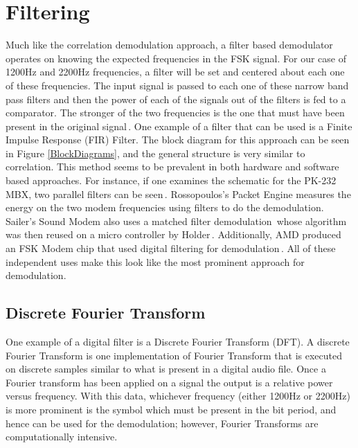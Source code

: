 \section{Filtering}
Much like the correlation demodulation approach, a filter based demodulator operates on knowing the expected frequencies in the FSK signal. For our case of 1200Hz and 2200Hz frequencies, a filter will be set and centered about each one of these frequencies. The input signal is passed to each one of these narrow band pass filters and then the power of each of the signals out of the filters is fed to a comparator. The stronger of the two frequencies is the one that must have been present in the original signal\,\cite{Watson1980}. One example of a filter that can be used is a Finite Impulse Response (FIR) Filter. The block diagram for this approach can be seen in Figure \ref{BlockDiagrams}, and the general structure is very similar to correlation. This method seems to be prevalent in both hardware and software based approaches. For instance, if one examines the schematic for the PK-232 MBX, two parallel filters can be seen\,\cite{Inc.2001}. Rossopoulos's Packet Engine measures the energy on the two modem frequencies using filters to do the demodulation. Sailer's Sound Modem also uses a matched filter demodulation\,\cite{Sailer1995} whose algorithm was then reused on a micro controller by Holder\,\cite{Holder2012}. Additionally, AMD produced an FSK Modem chip that used digital filtering for demodulation\,\cite{Devices1989}. All of these independent uses make this look like the most prominent approach for demodulation.

\subsection{Discrete Fourier Transform}
One example of a digital filter is a Discrete Fourier Transform (DFT). A discrete Fourier Transform is one implementation of Fourier Transform that is executed on discrete samples similar to what is present in a digital audio file. Once a Fourier transform has been applied on a signal the output is a relative power versus frequency. With this data, whichever frequency (either 1200Hz or 2200Hz) is more prominent is the symbol which must be present in the bit period, and hence can be used for the demodulation; however, Fourier Transforms are computationally intensive.

